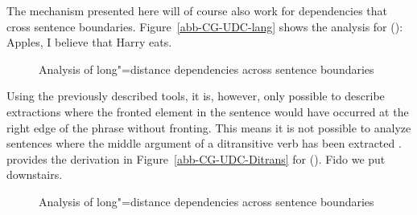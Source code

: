 \noindent
The mechanism presented here will of course also work for dependencies that cross sentence boundaries.
Figure~\vref{abb-CG-UDC-lang} shows the analysis for ():
\ea
Apples, I believe that Harry eats.
\z
\begin{figure}
\centerline{%
}
\caption{\label{abb-CG-UDC-lang}Analysis of long"=distance dependencies across sentence boundaries}
\end{figure}%
%
Using the previously described tools, it is, however, only possible to describe extractions where the fronted element
in the sentence would have occurred at the right edge of the phrase without fronting. This means it is not possible to analyze sentences where the
middle argument of a ditransitive verb has been extracted \citep[]{Steedman85a-u}. \citet[]{Pollard88a} provides the derivation
in Figure~\vref{abb-CG-UDC-Ditrans} for ().
\ea
Fido we put downstairs.
\z
\begin{figure}
\centerline{%
}
\caption{\label{abb-CG-UDC-Ditrans}Analysis of long"=distance dependencies across sentence boundaries}
\end{figure}%
